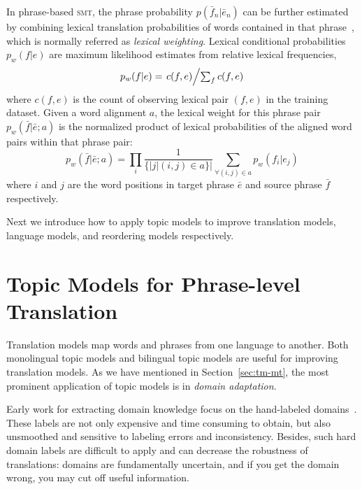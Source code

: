 In phrase-based \textsc{smt}, the phrase probability $p(\bar{f}_n |
\bar{e}_n)$ can be further estimated by combining lexical translation
probabilities of words contained in that phrase~\citep{koehn-03},
which is normally referred as \textit{lexical weighting}. Lexical
conditional probabilities $p_w(f|e)$ are maximum likelihood estimates
from relative lexical frequencies,
\begin{equation}
\label{eq:lexical_prob}
p_w(f|e) = \textstyle \left.c(f, e)\middle/\sum_f{c(f, e)}\right.
\end{equation}
where $c(f, e)$ is the count of observing lexical pair $(f, e)$ in the
training dataset. Given a word alignment $a$, the lexical weight for
this phrase pair $p_w(\bar{f} | \bar{e}; a)$ is the normalized product
of lexical probabilities of the aligned word pairs within that phrase
pair:
\begin{equation}
\label{eq:phrase_prob}
p_w(\bar{f} | \bar{e}; a) = \prod_{i} \frac{1}{\{|j | (i, j) \in a\}|} \sum_{\forall (i,j) \in a} p_w(f_i | e_j)
\end{equation}
where $i$ and $j$ are the word positions in target phrase $\bar{e}$
and source phrase $\bar{f}$ respectively.

Next we introduce how to apply topic models to improve translation
models, language models, and reordering models respectively.


\section{Topic Models for Phrase-level Translation}
\label{sec:trans-multiling}

Translation models map words and phrases from one language to another.
Both monolingual topic models and bilingual topic models are useful for improving translation models.
As we have mentioned in Section~\ref{sec:tm-mt}, 
the most prominent application of topic models is in {\em domain adaptation}.

Early work for extracting domain knowledge focus on the hand-labeled domains~\citep{foster-07,matsoukas-09,chiang-11}.
These labels are not only expensive and time consuming to obtain, but also unsmoothed and sensitive 
to labeling errors and inconsistency. Besides, such hard domain labels are difficult to 
apply and can decrease the robustness of translations: domains are fundamentally uncertain, 
and if you get the domain wrong, you may cut off useful information.


